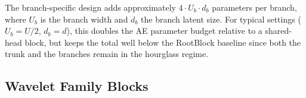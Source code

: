 \documentclass{article}
\begin{document}
\begin{table}
  \caption{Single-trunk vs.\ branch-specific AE designs.}
  \label{tab:branch-ae}
  \centering
\end{table}

The branch-specific design adds approximately $4 \cdot U_b \cdot d_b$ parameters per branch, where $U_b$ is the branch width and $d_b$ the branch latent size. For typical settings ($U_b = U/2$, $d_b = d$), this doubles the AE parameter budget relative to a shared-head block, but keeps the total well below the RootBlock baseline since both the trunk and the branches remain in the hourglass regime.

\subsection{Wavelet Family Blocks}
\label{sec:wavelet}
\end{document}

